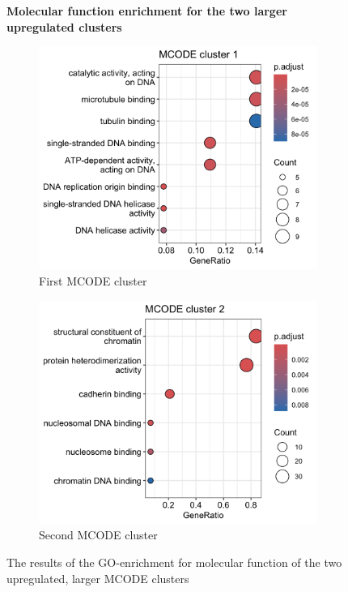  \begin{figure}[htb]
 	\centering
 	\caption*{\textbf{Molecular function enrichment for the two larger upregulated clusters}}
		\begin{subfigure}{.49\textwidth}
			\centering
 			\includegraphics[width=\textwidth]{fig/mf-mcode-cluster1}
 			\caption{First MCODE cluster}
 		\end{subfigure}
    	\begin{subfigure}{.49\textwidth}
    		\centering
 			\includegraphics[width=\textwidth]{fig/mf-mcode-cluster2.png}
 			\caption{Second MCODE cluster}
 		\end{subfigure}
 	\caption{The results of the GO-enrichment for molecular function of the two upregulated, larger MCODE clusters}
 	\label{fig:mcode-cluster-mf}
 \end{figure}

